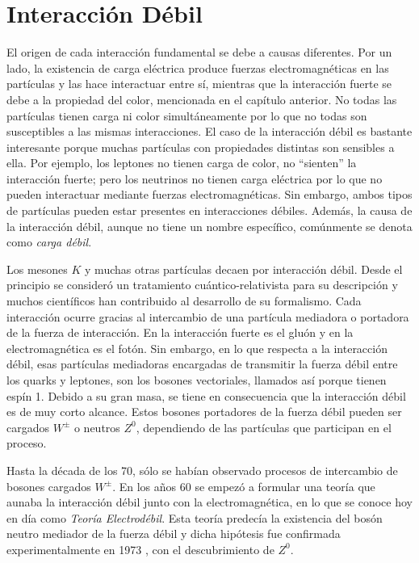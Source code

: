 \chapter{Interacción Débil}\label{cap:weak_int}
El origen de cada interacción fundamental se debe a causas diferentes. Por un lado, la existencia de carga eléctrica produce fuerzas electromagnéticas en las partículas y las hace interactuar entre sí, mientras que la interacción fuerte se debe a la propiedad del color, mencionada en el capítulo anterior. No todas las partículas tienen carga ni color simultáneamente por lo que no todas son susceptibles a las mismas interacciones. El caso de la interacción débil es bastante interesante porque muchas partículas con propiedades distintas son sensibles a ella. Por ejemplo, los leptones no tienen carga de color, no ``sienten'' la interacción fuerte; pero los neutrinos no tienen carga eléctrica por lo que no pueden interactuar mediante fuerzas electromagnéticas. Sin embargo, ambos tipos de partículas pueden estar presentes en interacciones débiles.\cite{Griffiths2008} Además, la causa de la interacción débil, aunque no tiene un nombre específico, comúnmente se denota como \textit{carga débil}.

Los mesones $K$ y muchas otras partículas decaen por interacción débil. Desde el principio se consideró un tratamiento cuántico-relativista para su descripción y muchos científicos han contribuido al desarrollo de su formalismo. Cada interacción ocurre gracias al intercambio de una partícula mediadora o portadora de la fuerza de interacción. En la interacción fuerte es el gluón y en la electromagnética es el fotón. Sin embargo, en lo que respecta a la interacción débil, esas partículas mediadoras encargadas de transmitir la fuerza débil entre los quarks y leptones, son los bosones vectoriales, llamados así porque tienen espín 1. Debido a su gran masa, se tiene en consecuencia que la interacción débil es de muy corto alcance. Estos bosones portadores de la fuerza débil pueden ser cargados $W^{\pm}$ o neutros $Z^0$, dependiendo de las partículas que participan en el proceso. 

Hasta la década de los 70, sólo se habían observado procesos de intercambio de bosones cargados $W^{\pm}$. En los años 60 se empezó a formular una teoría que aunaba la interacción débil junto con la electromagnética, en lo que se conoce hoy en día como \textit{Teoría Electrodébil}. Esta teoría predecía la existencia del bosón neutro mediador de la fuerza débil y dicha hipótesis fue confirmada experimentalmente en 1973 \cite{BrianM}, con el descubrimiento de $Z^0$.

